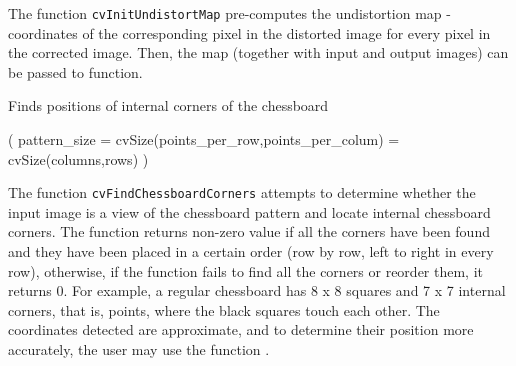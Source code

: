 The function \texttt{cvInitUndistortMap} pre-computes the undistortion map - coordinates of the corresponding pixel in the distorted image for every pixel in the corrected image. Then, the map (together with input and output images) can be passed to  function.


\label{FindChessboardCorners}

Finds positions of internal corners of the chessboard


\begin{description}
( pattern\_size = cvSize(points\_per\_row,points\_per\_colum) = cvSize(columns,rows) )
\end{description}

The function \texttt{cvFindChessboardCorners} attempts to determine
whether the input image is a view of the chessboard pattern and
locate internal chessboard corners. The function returns non-zero
value if all the corners have been found and they have been placed
in a certain order (row by row, left to right in every row),
otherwise, if the function fails to find all the corners or reorder
them, it returns 0. For example, a regular chessboard has 8 x 8
squares and 7 x 7 internal corners, that is, points, where the black
squares touch each other. The coordinates detected are approximate,
and to determine their position more accurately, the user may use
the function .

